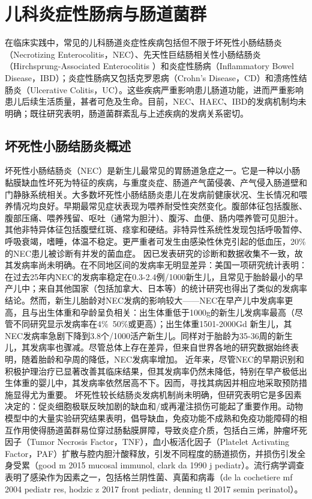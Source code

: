 \section{儿科炎症性肠病与肠道菌群}
\label{sec:enterocolitis}
在临床实践中，常见的儿科肠道炎症性疾病包括但不限于坏死性小肠结肠炎（Necrotizing Enterocolitis，NEC）、先天性巨结肠相关性小肠结肠炎（Hirchsprung-Associated Enterocolitis ）和炎症性肠病（Inflammatory Bowel Disease，IBD）；炎症性肠病又包括克罗恩病（Crohn’s Disease，CD）和溃疡性结肠炎（Ulcerative Colitis，UC）。这些疾病严重影响患儿肠道功能，进而严重影响患儿后续生活质量，甚者可危及生命。目前，NEC、HAEC、IBD的发病机制均未明确；既往研究表明，肠道菌群紊乱与上述疾病的发病关系密切。

\subsection{坏死性小肠结肠炎概述}
坏死性小肠结肠炎（NEC）是新生儿最常见的胃肠道急症之一。它是一种以小肠黏膜缺血性坏死为特征的疾病，与重度炎症、肠道产气菌侵袭、产气侵入肠道壁和门静脉系统相关\cite{neu2011necrotizing}。大多数坏死性小肠结肠炎患儿在发病前健康状况、生长情况和喂养情况均良好\cite{hallstrom2006laboratory}。早期最常见症状表现为喂养耐受性突然变化。腹部体征包括腹胀、腹部压痛、喂养残留、呕吐（通常为胆汁）、腹泻、血便、肠内喂养管可见胆汁\cite{walsh1988necrotizing, yu1980improving}。其他非特异体征包括腹壁红斑、痉挛和硬结。非特异性系统性发现包括呼吸暂停、呼吸衰竭，嗜睡，体温不稳定。更严重者可发生由感染性休克引起的低血压，20\%的NEC患儿被诊断有并发的菌血症\cite{kliegman1984necrotizing}。
因已发表研究的诊断和数据收集不一致，故其发病率尚未明确\cite{zani2015scavenger}。在不同地区间的发病率无明显差异：美国一项研究统计表明：在过去25年内NEC的发病率稳定在0.3-2.4例/1000新生儿，且常见于胎龄最小的早产儿中\cite{pickard2009short}；来自其他国家（包括加拿大、日本等）的统计研究也得出了类似的发病率结论\cite{kawase2006gastrointestinal}。然而，新生儿胎龄对NEC发病的影响较大——NEC在早产儿中发病率更高，且与出生体重和孕龄呈负相关：出生体重低于1000g的新生儿发病率最高（尽管不同研究显示发病率在4\%~50\%或更高）；出生体重1501-2000Gd 新生儿，其NEC发病率急剧下降到3.8个/1000活产新生儿\cite{stoll2015trends}。同样对于胎龄为35-36周的新生儿，其发病率也骤减。尽管总体上存在差异，但来自世界各地的研究数据始终表明，随着胎龄和孕周的降低，NEC发病率增加\cite{backhed2005host,rees2010national,yee2012incidence}。
近年来，尽管NEC的早期识别和积极护理治疗已显著改善其临床结果，但其发病率仍然未降低，特别在早产极低出生体重的婴儿中，其发病率依然居高不下。因而，寻找其病因并相应地采取预防措施显得尤为重要。
坏死性较长结肠炎发病机制尚未明确，但研究表明它是多因素决定的：促炎细胞极联反映加剧的缺血和/或再灌注损伤可能起了重要作用。动物模型中的大量实验研究结果表明，倡导缺血，免疫功能不成熟和免疫功能障碍的相互作用使得肠道菌群易位穿过肠黏膜屏障，导致炎症介质，包括白三烯，肿瘤坏死因子（Tumor Necrosis Factor，TNF），血小板活化因子（Platelet Activating Factor，PAF）扩散与腔内胆汁酸释放，引发不同程度的肠道损伤，并损伤引发全身受累\cite{good2015breast}（good m 2015 mucosal immunol, clark da 1990 j pediatr）。流行病学调查表明了感染作为因素之一，包括格兰阴性菌、真菌和病毒\cite{}（de la cochetiere mf 2004 pediatr res, hodzic z 2017 front pediatr, denning tl 2017 semin perinatol）。
